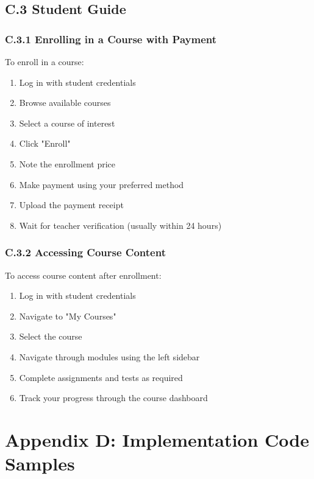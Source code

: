 \subsection*{C.3 Student Guide}

\subsubsection*{C.3.1 Enrolling in a Course with Payment}

To enroll in a course:

\begin{enumerate}
    \item Log in with student credentials
    \item Browse available courses
    \item Select a course of interest
    \item Click "Enroll"
    \item Note the enrollment price
    \item Make payment using your preferred method
    \item Upload the payment receipt
    \item Wait for teacher verification (usually within 24 hours)
\end{enumerate}

\subsubsection*{C.3.2 Accessing Course Content}

To access course content after enrollment:

\begin{enumerate}
    \item Log in with student credentials
    \item Navigate to "My Courses"
    \item Select the course
    \item Navigate through modules using the left sidebar
    \item Complete assignments and tests as required
    \item Track your progress through the course dashboard
\end{enumerate}

\section*{Appendix D: Implementation Code Samples}

